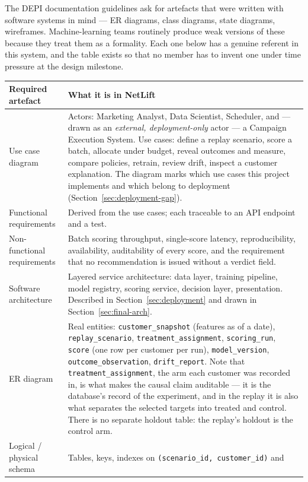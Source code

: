 \documentclass[11pt,a4paper]{article}
\begin{document}
The DEPI documentation guidelines ask for artefacts that were written with software systems in
mind --- ER diagrams, class diagrams, state diagrams, wireframes. Machine-learning teams routinely
produce weak versions of these because they treat them as a formality. Each one below has a genuine
referent in this system, and the table exists so that no member has to invent one under time
pressure at the design milestone.

\begin{longtable}{@{}L{3.8cm}L{10.6cm}@{}}
\toprule
\textbf{Required artefact} & \textbf{What it is in NetLift} \\
\midrule
\endhead
Use case diagram & Actors: Marketing Analyst, Data Scientist, Scheduler, and --- drawn as an
\emph{external, deployment-only} actor --- a Campaign Execution System. Use cases: define a replay
scenario, score a batch, allocate under budget, reveal outcomes and measure, compare policies,
retrain, review drift, inspect a customer explanation. The diagram marks which use cases this
project implements and which belong to deployment (Section~\ref{sec:deployment-gap}). \\
Functional requirements & Derived from the use cases; each traceable to an API endpoint and a test. \\
Non-functional requirements & Batch scoring throughput, single-score latency, reproducibility,
availability, auditability of every score, and the requirement that no recommendation is issued
without a verdict field. \\
Software architecture & Layered service architecture: data layer, training pipeline, model
registry, scoring service, decision layer, presentation. Described in Section~\ref{sec:deployment}
and drawn in Section~\ref{sec:final-arch}. \\
ER diagram & Real entities: \texttt{customer\_snapshot} (features as of a date),
\texttt{replay\_scenario}, \texttt{treatment\_assignment},
\texttt{scoring\_run}, \texttt{score} (one row per customer per run), \texttt{model\_version},
\texttt{outcome\_observation}, \texttt{drift\_report}. Note that
\texttt{treatment\_assignment}, the arm each customer was recorded in, is what makes the causal
claim auditable --- it is the database's record of the experiment, and in the replay it is also
what separates the selected targets into treated and control. There is no separate holdout table:
the replay's holdout is the control arm. \\
Logical / physical schema & Tables, keys, indexes on \texttt{(scenario\_id, customer\_id)} and

\end{longtable}
\end{document}
